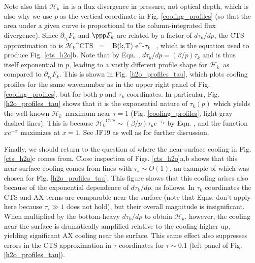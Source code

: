 \documentclass[10pt]{article}
\newcommand{\ch}{\ensuremath{\mathcal{H}}}
\newcommand{\chk}{\ensuremath{\ch_k}}
\newcommand{\tauk}{\ensuremath{\tau_k}}
\newcommand{\taus}{\ensuremath{\tau_s}}
\newcommand{\CTS}{\ensuremath{\mathrm{CTS}}}
\begin{document}
Note also that \chk\ in  is a flux divergence in pressure, not optical depth, which is also why we use $p$ as the vertical coordinate in Fig. \ref{cooling_profiles} (so that the area under a given curve is proportional to the column-integrated flux divergence). Since  $\partial_{\tauk} F_k$ and $\ppp F_k$ are related by a factor of $d \tauk/dp$,  the CTS approximation to  is
\beqn
	\chk^{\CTS} \ = \  \pi B(k,T) \der{\tauk}{p}e^{-\tauk} \ ,
	\label{chk_cts}
\eeqn
which is the equation used to produce Fig. \ref{cts_h2o}b. Note that by Eqn. , $d\tauk/dp = (\beta/p)\tauk$ and  is thus itself exponential in $p$, leading to a vastly different profile shape for \chk\ as compared to $\partial_{\tauk} F_k$.  This is shown in Fig. \ref{h2o_profiles_tau}, which plots cooling profiles for the same wavenumber as in the upper right panel of Fig. \ref{cooling_profiles}, but for both $p$ and $\tauk$ coordinates. In particular, Fig. \ref{h2o_profiles_tau} shows that it is the exponential nature of $\tauk(p)$ which yields the well-known  \chk\ maximum near $\tau=1$  (Fig. \ref{cooling_profiles}, light gray dashed lines). This is because $\chk^{\CTS} \sim (\beta/p)\tauk e^{-\tauk}$ by Eqn. , and the function $xe^{-x}$ maximizes at $x=1$. See JF19 as well as  \cite{huang2014} for further discussion. 


Finally, we should return to the question of where the near-surface cooling in Fig. \ref{cts_h2o}c comes from. Close inspection of Figs. \ref{cts_h2o}a,b shows that this  near-surface cooling comes from lines with $\taus \sim O(1)$, an example of which was chosen for  Fig. \ref{h2o_profiles_tau}. This figure shows that this cooling arises also because of the exponential dependence of $ d \tauk /dp$, as follows. In $\tauk$ coordinates the CTS and AX terms are comparable near the surface (note that Eqns.  don't apply here because $\taus \gg 1$ does not hold), but their overall magnitude is insignificant. When multiplied by the bottom-heavy $d \tauk/dp$ to obtain \chk, however, the cooling near the surface is dramatically amplified relative to the cooling higher up, yielding significant AX cooling near the surface. This same effect also suppresses errors in the CTS approximation in $\tau$ coordinates for $\tau \sim 0.1$ (left panel of Fig. \ref{h2o_profiles_tau}).
\end{document}
